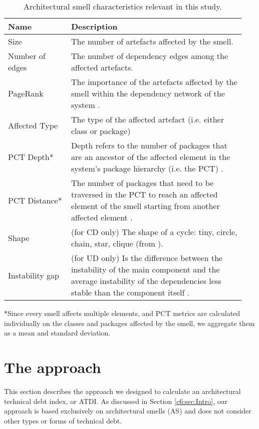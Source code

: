 \begin{table}[tbp]
    \footnotesize
    \centering
    \caption{Architectural smell characteristics relevant in this study.}\label{c6:tab:characteristics}
    \begin{tabular}{p{0.25\linewidth}|p{0.69\linewidth}}\toprule
        \textbf{Name} & \textbf{Description} \\ \midrule
        Size & The number of artefacts affected by the smell. \\
        Number of edges & The number of dependency edges among the affected artefacts. \\ 
        PageRank & The importance of the artefacts affected by the smell within the dependency network of the system \cite{Roveda2018}. \\
        Affected Type & The type of the affected artefact (i.e. either class or package) \\
        PCT Depth* & Depth refers to the number of packages that are an ancestor of the affected element in the system's package hierarchy (i.e. the PCT) \cite{Laval2012}. \\
        PCT Distance* & The number of packages that need to be traversed in the PCT to reach an affected element of the smell starting from another affected element \cite{Laval2012,AlMutawa2014}.\\
        Shape & (for CD only) The shape of a cycle: tiny, circle, chain, star, clique (from \cite{AlMutawa2014}). \\
        Instability gap & (for UD only) Is the difference between the instability of the main component and the average instability of the dependencies less stable than the component itself \cite{Arcelli2016}. \\\midrule
    \end{tabular}
    \scriptsize{*Since every smell affects multiple elements, and PCT metrics are calculated individually on the classes and packages affected by the smell, we aggregate them as a mean and standard deviation.}
\end{table}

\section{The approach}\label{c6:sec:approach}
This section describes the approach we designed to calculate an architectural technical debt index, or ATDI.
As discussed in Section \ref{c6:sec:Intro}, our approach is based exclusively on architectural smells (AS) and does not consider other types or forms of technical debt. 


